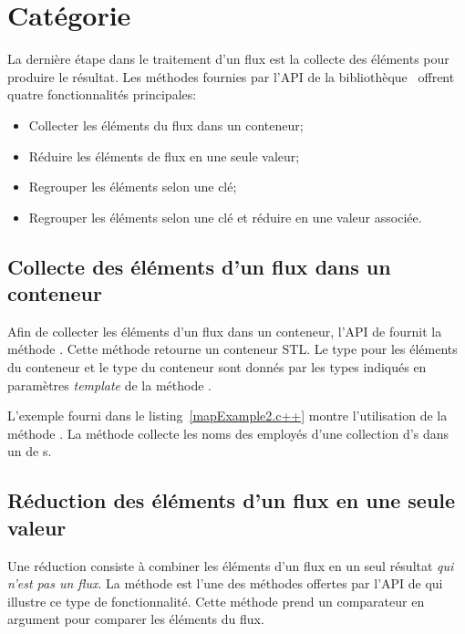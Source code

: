 \section{Cat\'egorie }

\label{agregation.sect}

La derni\`ere \'etape dans le traitement d'un flux est la collecte des \'el\'ements pour produire le r\'esultat. Les m\'ethodes fournies par l'API de la biblioth\`eque \ppff\ offrent quatre fonctionnalit\'es principales: 


\begin{itemize}
	\item Collecter les \'el\'ements du flux dans un conteneur;	

	\item R\'eduire les \'el\'ements de flux en une seule valeur;

	\item Regrouper les \'el\'ements selon une cl\'e;
	
	\item Regrouper les \'el\'ements selon une cl\'e et r\'eduire en une valeur associ\'ee.
\end{itemize}


\subsection{Collecte des \'el\'ements d'un flux dans un conteneur}

Afin de collecter les \'el\'ements d'un flux dans un conteneur, l'{API} de  fournit la m\'ethode . Cette m\'ethode retourne un conteneur {STL}. Le type pour les \'el\'ements du conteneur et le type du conteneur sont donn\'es par les types indiqu\'es en param\`etres \emph{template} de la m\'ethode . 

L'exemple fourni dans le listing~\ref{mapExample2.c++} montre l'utilisation de la m\'ethode . La m\'ethode collecte les noms des employ\'es d'une collection d's dans un  de s.


\subsection{R\'eduction des \'el\'ements d'un flux en une seule valeur}

Une r\'eduction
consiste \`a combiner les \'el\'ements d'un flux en un seul r\'esultat \emph{qui n'est pas un flux}. La m\'ethode   est l'une des m\'ethodes offertes par l'{API} de  qui illustre ce type de fonctionnalit\'e. Cette m\'ethode prend un comparateur en argument pour comparer les \'el\'ements du flux. 

